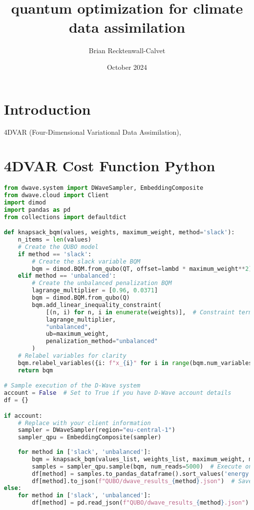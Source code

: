 \documentclass{article}
\title{quantum optimization for climate data assimilation}
\author{Brian Recktenwall-Calvet}
\date{October 2024}
\begin{document}
\maketitle

\section{Introduction}

4DVAR (Four-Dimensional Variational Data Assimilation), 


\section{4DVAR Cost Function Python}
\begin{lstlisting}[language=Python]
from dwave.system import DWaveSampler, EmbeddingComposite
from dwave.cloud import Client
import dimod
import pandas as pd
from collections import defaultdict

def knapsack_bqm(values, weights, maximum_weight, method='slack'):
    n_items = len(values)
    # Create the QUBO model
    if method == 'slack':
        # Create the slack variable BQM
        bqm = dimod.BQM.from_qubo(QT, offset=lambd * maximum_weight**2)
    elif method == 'unbalanced':
        # Create the unbalanced penalization BQM
        lagrange_multiplier = [0.96, 0.0371]
        bqm = dimod.BQM.from_qubo(Q)
        bqm.add_linear_inequality_constraint(
            [(n, i) for n, i in enumerate(weights)],  # Constraint terms
            lagrange_multiplier,
            "unbalanced",
            ub=maximum_weight,
            penalization_method="unbalanced"
        )
    # Relabel variables for clarity
    bqm.relabel_variables({i: f"x_{i}" for i in range(bqm.num_variables)})
    return bqm

# Sample execution of the D-Wave system
account = False  # Set to True if you have D-Wave account details
df = {}

if account:
    # Replace with your client information
    sampler = DWaveSampler(region="eu-central-1")
    sampler_qpu = EmbeddingComposite(sampler)
    
    for method in ['slack', 'unbalanced']:
        bqm = knapsack_bqm(values_list, weights_list, maximum_weight, method)
        samples = sampler_qpu.sample(bqm, num_reads=5000)  # Execute on real hardware
        df[method] = samples.to_pandas_dataframe().sort_values('energy').reset_index(drop=True)
        df[method].to_json(f"QUBO/dwave_results_{method}.json")  # Save the results
else:
    for method in ['slack', 'unbalanced']:
        df[method] = pd.read_json(f"QUBO/dwave_results_{method}.json")  # Load previous results


\end{lstlisting}
\end{document}
